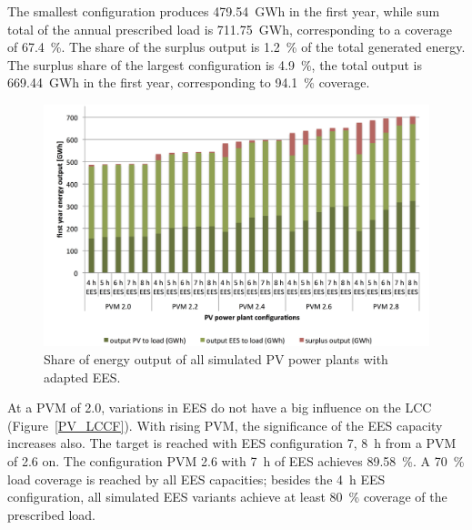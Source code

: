 The smallest configuration produces \SI{479.54}{GWh} in the first year, while sum total of the annual prescribed load is \SI{711.75}{GWh}, corresponding to a coverage of \SI{67.4}{\percent}. The share of the surplus output is \SI{1.2}{\percent} of the total generated energy. The surplus share of the largest configuration is \SI{4.9}{\percent}, the total output is \SI{669.44}{GWh} in the first year, corresponding to \SI{94.1}{\percent} coverage.

\begin{figure}[htbp]  
\centering
\includegraphics[width=0.82\linewidth]{FIG/PV_energy_output}
\caption[Share of energy output of all simulated PV power plants with adapted EES.]{Share of energy output of all simulated PV power plants with adapted EES.}\label{PV_energy_output}
\end{figure}
At a \ac{PVM} of \num{2.0}, variations in \ac{EES} do not have a big influence on the \ac{LCC} (Figure~\ref{PV_LCCF}). With rising \ac{PVM}, the significance of the \ac{EES} capacity increases also. The target is reached with \ac{EES} configuration 7, \SI{8}{h} from a \ac{PVM} of 2.6 on. The configuration \ac{PVM} \num{2.6} with \SI{7}{h} of \ac{EES} achieves \SI{89.58}{\percent}. A \SI{70}{\percent} load coverage is reached by all \ac{EES} capacities; besides the \SI{4}{h} \ac{EES} configuration, all simulated \ac{EES} variants achieve at least \SI{80}{\percent} coverage of the prescribed load. 

